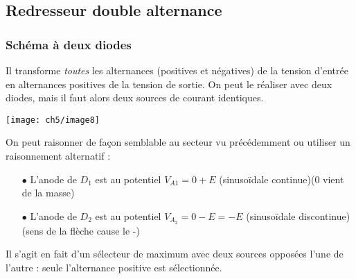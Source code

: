 		\subsection{Redresseur double alternance}
			\subsubsection{Schéma à deux diodes}
			Il transforme \textit{toutes} les alternances (positives et négatives) 
			de la tension d'entrée en alternances positives de la tension de sortie. 
			On peut le réaliser avec deux diodes, mais il faut alors deux sources 
			de courant identiques.
			\begin{center}
			\texttt{[image: ch5/image8]}
			\end{center}
			On peut raisonner de façon semblable au secteur vu précédemment ou 
			utiliser un raisonnement alternatif :
			\begin{itemize}
			\item[$\bullet$] L'anode de $D_1$ est au potentiel $V_{A1} = 0+E$ 
			(sinusoïdale continue)(0 vient de la masse)
			\item[$\bullet$] L'anode de $D_2$ est au potentiel $V_{A_2} = 0-E=-E$ 
			(sinusoïdale discontinue)(sens de la flèche cause le -)
			\end{itemize}
			Il s'agit en fait d'un sélecteur de maximum avec deux sources opposées 
			l'une de l'autre : seule l'alternance positive est sélectionnée.
			
